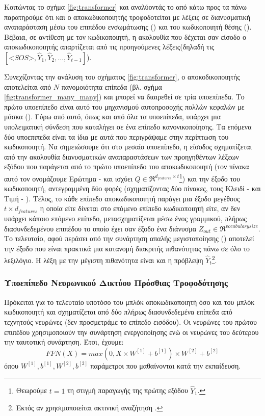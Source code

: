 Κοιτώντας το σχήμα \ref{fig:transformer} και αναλύοντάς το από κάτω προς τα πάνω παρατηρούμε ότι και ο αποκωδικοποιητής τροφοδοτείται με λέξεις σε διανυσματική αναπαράσταση μέσω του επιπέδου ενσωμάτωσης () και του κωδικοποιητή θέσης (). Βέβαια, σε αντίθεση με τον κωδικοποιητή, η ακολουθία που δέχεται σαν είσοδο ο αποκωδικοποιητής απαρτίζεται από τις προηγούμενες λέξεις (δηλαδή τις$[\mathbin{<}SOS\mathbin{>}, \hat{Y}_1, \hat{Y}_2, \dots, \hat{Y}_{t-1}]$).\par

Συνεχίζοντας την ανάλυση του σχήματος \ref{fig:transformer}, ο αποκοδικοποιητής αποτελείται από $N$ πανομοιότηπα επίπεδα (βλ. σχήμα \ref{fig:transformer_many_many}) και μπορεί να διαιρεθεί σε τρία υποεπίπεδα. Το πρώτο υπο\textendash επίπεδο είναι αυτό του μηχανισμού αυτο\textendash προσοχής πολλών κεφαλών με μάσκα (). Γύρω από αυτό, όπως και από όλα τα υπο\textendash επίπεδα, υπάρχει μια υπολειματική σύνδεση που καταλήγει σε ένα επίπεδο κανονικοποίησης. Τα επόμενα δύο υπο\textendash επιπεδα είναι τα ίδια με αυτά που περιγράψαμε στην περίπτωση του κωδικοποιητή. Να σημειώσουμε ότι στο μεσαίο υπο\textendash επίπεδο, η είσοδος σχηματίζεται από την ακολουθία διανυσματικών αναπαραστάσεων των προηγηθέντων λέξεων εξόδου που παράγεται από το πρώτο υπο\textendash επίπεδο του αποκωδικοποιητή (τον πίνακα αυτό τον ονομάζουμε Ερώτημα -  και ισχύει $Q \in \Re^{d_{features} \times {t}}$\footnote{Θεωρούμε $t=1$ τη στιγμή παραγωγής της πρώτης εξόδου $\hat{Y}_1$.}) και την έξοδο του κωδικοποιητή, αντεγραμμένη δύο φορές (σχηματίζοντας δύο πίνακες, τους Κλειδί -  και Τιμή - ). Τέλος, το κάθε επίπεδο αποκωδικοποιητή παράγει μια έξοδο μεγέθους $t \times d_{features}$ η οποία είτε δίνεται στο επόμενο επίπεδο κωδικοποιητή είτε, αν δεν υπάρχει κάποιο επόμενο επίπεδο, μετασχηματίζεται μέσω ένος γραμμικού, πλήρως διασυνδεδεμένου επιπέδου το οποίο έχει σαν έξοδο ένα διάνυσμα $Z_{out} \in \Re^{vocabulary size}$. Το τελευταίο, αφού περάσει από την συνάρτηση απαλής μεγιστοποίησης () αποτελεί την έξοδο που είναι πρακτικά μια κατανομή διακριτής πιθανότητας πάνω σε όλο το λεξιλόγιο. Η λέξη με την μέγιστη πιθανότητα είναι και η πρόβλεψη $\hat{Y}_t$\footnote{Εκτός αν χρησιμοποιείται ακτινική αναζήτηση .}.

\subsubsection{Υπο\textendash επίπεδο Νευρωνικού Δικτύου Πρόσθιας Τροφοδότησης}
Πρόκειται για το τελευταίο υπο τόσο του μπλόκ αποκωδικοποιητή όσο και του μπλόκ κωδικοποιητή και σχηματίζεται από δύο πλήρως διασυνδεδεμένα επίπεδα από τεχνητούς νευρώνες (δεν προσμετράμε το επίπεδο εισόδου). Οι νευρώνες του πρώτου επιπέδου χρησιμοποιούν την συνάρτηση ενεργοποίησης  ενώ οι νευρώνες του δεύτερου την ταυτοτική συνάρτηση. Έτσι, έχουμε:
\[
  FFN(X) = max(0, X \times W^{[1]} + b^{[1]})\times W^{[2]} + b^{[2]}
\]όπου $W^{[1]}, b^{[1]}, W^{[2]}, b^{[2]}$ παράμετροι που μαθαίνονται κατά την εκπαίδευση.\par

